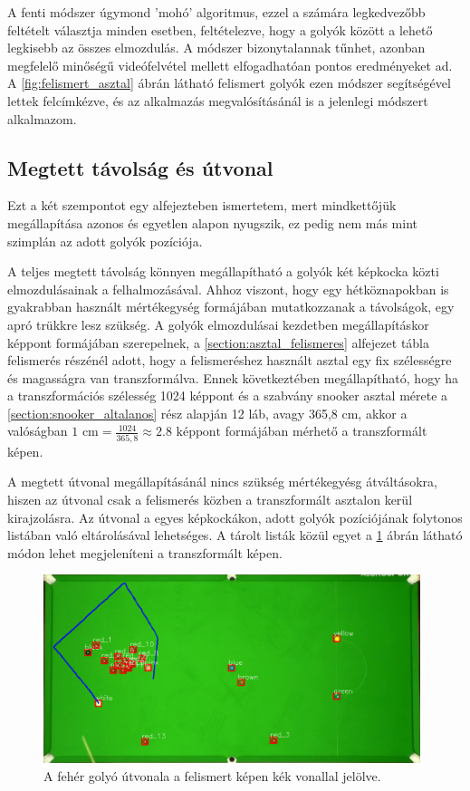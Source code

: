 \par A fenti módszer úgymond 'mohó' algoritmus, ezzel a számára legkedvezőbb feltételt választja minden esetben, feltételezve, hogy a golyók között a lehető legkisebb az összes elmozdulás. A módszer bizonytalannak tűnhet, azonban megfelelő minőségű videófelvétel mellett elfogadhatóan pontos eredményeket ad. A \ref{fig:felismert_asztal} ábrán látható felismert golyók ezen módszer segítségével lettek felcímkézve, és az alkalmazás megvalósításánál is a jelenlegi módszert alkalmazom.

\subsection{Megtett távolság és útvonal}
Ezt a két szempontot egy alfejezteben ismertetem, mert mindkettőjük megállapítása azonos és egyetlen alapon nyugszik, ez pedig nem más mint szimplán az adott golyók pozíciója.
\par A teljes megtett távolság könnyen megállapítható a golyók két képkocka közti elmozdulásainak a felhalmozásával. Ahhoz viszont, hogy egy hétköznapokban is gyakrabban használt mértékegység formájában mutatkozzanak a távolságok, egy apró trükkre lesz szükség. A golyók elmozdulásai kezdetben megállapításkor képpont formájában szerepelnek, a \ref{section:asztal_felismeres} alfejezet tábla felismerés részénél adott, hogy a felismeréshez használt asztal egy fix szélességre és magasságra van transzformálva. Ennek következtében megállapítható, hogy ha a transzformációs szélesség 1024 képpont és a szabvány snooker asztal mérete a \ref{section:snooker_altalanos} rész alapján 12 láb, avagy 365,8 cm, akkor a valóságban $1\text{ cm} = \frac{1024}{365,8} \approx 2.8\text{ képpont}$ formájában mérhető a transzformált képen.
\par A megtett útvonal megállapításánál nincs szükség mértékegyésg átváltásokra, hiszen az útvonal csak a felismerés közben a transzformált asztalon kerül kirajzolásra. Az útvonal a egyes képkockákon, adott golyók pozíciójának folytonos listában való eltárolásával lehetséges. A tárolt listák közül egyet a \ref{fig:golyo_utvonal} ábrán látható módon lehet megjeleníteni a transzformált képen.

\begin{figure}[!ht]
    \centering
    \includegraphics[width=110mm, keepaspectratio]{figures/ball_path.png}
    \caption{A fehér golyó útvonala a felismert képen kék vonallal jelölve.}
    \label{fig:golyo_utvonal}
\end{figure}

